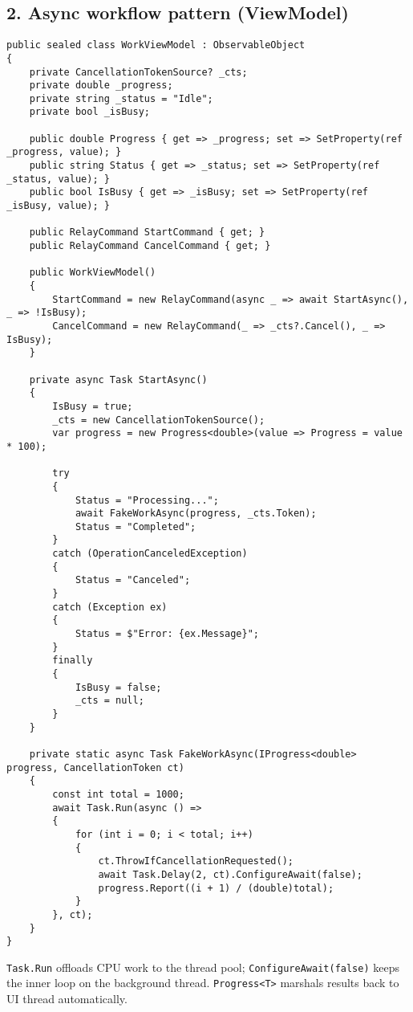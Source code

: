 \subsection{2. Async workflow pattern
(ViewModel)}\label{async-workflow-pattern-viewmodel}

\begin{lstlisting}
public sealed class WorkViewModel : ObservableObject
{
    private CancellationTokenSource? _cts;
    private double _progress;
    private string _status = "Idle";
    private bool _isBusy;

    public double Progress { get => _progress; set => SetProperty(ref _progress, value); }
    public string Status { get => _status; set => SetProperty(ref _status, value); }
    public bool IsBusy { get => _isBusy; set => SetProperty(ref _isBusy, value); }

    public RelayCommand StartCommand { get; }
    public RelayCommand CancelCommand { get; }

    public WorkViewModel()
    {
        StartCommand = new RelayCommand(async _ => await StartAsync(), _ => !IsBusy);
        CancelCommand = new RelayCommand(_ => _cts?.Cancel(), _ => IsBusy);
    }

    private async Task StartAsync()
    {
        IsBusy = true;
        _cts = new CancellationTokenSource();
        var progress = new Progress<double>(value => Progress = value * 100);

        try
        {
            Status = "Processing...";
            await FakeWorkAsync(progress, _cts.Token);
            Status = "Completed";
        }
        catch (OperationCanceledException)
        {
            Status = "Canceled";
        }
        catch (Exception ex)
        {
            Status = $"Error: {ex.Message}";
        }
        finally
        {
            IsBusy = false;
            _cts = null;
        }
    }

    private static async Task FakeWorkAsync(IProgress<double> progress, CancellationToken ct)
    {
        const int total = 1000;
        await Task.Run(async () =>
        {
            for (int i = 0; i < total; i++)
            {
                ct.ThrowIfCancellationRequested();
                await Task.Delay(2, ct).ConfigureAwait(false);
                progress.Report((i + 1) / (double)total);
            }
        }, ct);
    }
}
\end{lstlisting}

\passthrough{\lstinline!Task.Run!} offloads CPU work to the thread pool;
\passthrough{\lstinline!ConfigureAwait(false)!} keeps the inner loop on
the background thread. \passthrough{\lstinline!Progress<T>!} marshals
results back to UI thread automatically.

